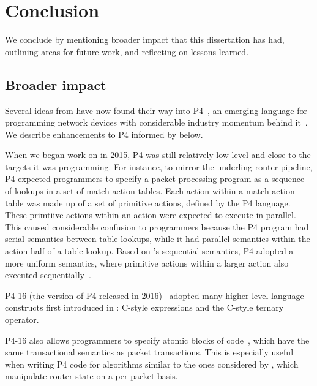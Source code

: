 \chapter{Conclusion}
\label{chap:concl}

We conclude by mentioning broader impact that this dissertation has had,
outlining areas for future work, and reflecting on lessons learned.

\section{Broader impact}
\label{s:impact}
Several ideas from \pktlanguage have now found their way into P4~\cite{p4}, an
emerging language for programming network devices with considerable industry
momentum behind it~\cite{p4org}. We describe enhancements to P4 informed by
\pktlanguage below.
\begin{CompactEnumerate}
\item When we began work on \pktlanguage in 2015, P4 was still relatively
low-level and close to the targets it was programming. For instance, to mirror
the underling router pipeline, P4 expected programmers to specify a
packet-processing program as a sequence of lookups in a set of match-action
tables. Each action within a match-action table was made up of a set of
primitive actions, defined by the P4 language. These primtiive actions within
an action were expected to execute in parallel. This caused considerable
confusion to programmers because the P4 program had serial semantics between
table lookups, while it had parallel semantics within the action half of a
table lookup. Based on \pktlanguage's sequential semantics, P4 adopted a more
uniform semantics, where primitive actions within a larger action also executed
sequentially~\cite{p4_sequential_pr, p4_sequential_issue}.
\item P4-16 (the version of P4 released in 2016)~\cite{p4_16} adopted many
higher-level language constructs first introduced in \pktlanguage: C-style
expressions and the C-style ternary operator.
\item P4-16 also allows programmers to specify atomic blocks of code~\cite{p4_atomic_pr, p4_atomic_issue}, which
have the same transactional semantics as packet transactions. This is
especially useful when writing P4 code for algorithms similar to the ones
considered by \pktlanguage, which manipulate router state on a per-packet
basis.
\end{CompactEnumerate}

